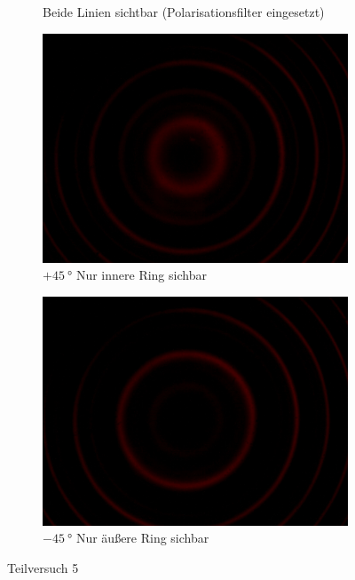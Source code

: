 \begin{figure}[!ht]
\begin{subfigure}{0.48\textwidth}
			\caption{Beide Linien sichtbar (Polarisationsfilter eingesetzt)}
			\vspace{0.5\baselineskip}
		\end{subfigure}
		\begin{subfigure}{0.48\textwidth}
			\centering
			\includegraphics[width=\textwidth]{images/Capture_827.bmp.jpg}
			\caption{$+\SI{45}{\degree}$ Nur innere Ring sichbar}
			\vspace{0.5\baselineskip}
		\end{subfigure}
		\hfill
		\begin{subfigure}{0.48\textwidth}
			\centering
			\includegraphics[width=\textwidth]{images/Capture_828.bmp.jpg}
			\caption{$-\SI{45}{\degree}$ Nur äußere Ring sichbar}
			\vspace{0.5\baselineskip}
		\end{subfigure}
	    \caption{Teilversuch 5}
	\end{figure}